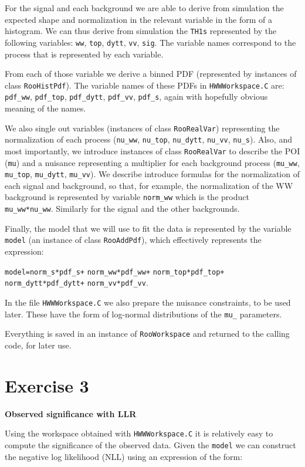 \documentclass[a4paper,12pt]{article}
\begin{document}
For the signal and each background we are able to derive from simulation the
expected shape and normalization in the relevant variable in the form of a
histogram. We can thus derive
from simulation the \verb+TH1s+ represented by the following variables:
\verb+ww+, \verb+top+, \verb+dytt+, \verb+vv+, \verb+sig+. The variable names
correspond to the process that is represented by each variable.

From each of those variable we derive a binned PDF (represented by instances
of class \verb+RooHistPdf+). The variable names of these PDFs in
\verb+HWWWorkspace.C+ are: \verb+pdf_ww+, \verb+pdf_top+, \verb+pdf_dytt+,
\verb+pdf_vv+, \verb+pdf_s+, again with hopefully obvious meaning of the
names.

We also single out variables (instances of class \verb+RooRealVar+)
representing the normalization of each process (\verb+nu_ww+, \verb+nu_top+,
\verb+nu_dytt+, \verb+nu_vv+, \verb+nu_s+).
Also, and most importantly, we introduce instances of class \verb+RooRealVar+
to describe the POI (\verb+mu+) and a nuisance representing a multiplier for
each background process (\verb+mu_ww+, \verb+mu_top+,
\verb+mu_dytt+, \verb+mu_vv+).
We describe introduce formulas for the normalization of each signal and
background, so that, for example, the normalization of the WW background is
represented by variable \verb+norm_ww+ which is the product
\verb+mu_ww*nu_ww+. Similarly for the signal and the other backgrounds.

Finally, the model that we will use to fit the data is represented by the
variable \verb+model+ (an instance of class \verb!RooAddPdf!), which effectively represents the expression:

\verb!model=norm_s*pdf_s+! 
\verb!norm_ww*pdf_ww+! 
\verb!norm_top*pdf_top+!\\ 
\verb!norm_dytt*pdf_dytt+! 
\verb!norm_vv*pdf_vv!.

In the file \verb+HWWWorkspace.C+ we also prepare the nuisance constraints, to
be used later. These have the form of log-normal distributions of the \verb+mu_+
parameters.

Everything is saved in an instance of \verb+RooWorkspace+ and returned to the
calling code, for later use.

\section*{Exercise 3}
{\bf Observed significance with LLR}

Using the workspace obtained with \verb+HWWWorkspace.C+ it is relatively easy
to compute the significance of the observed data.
Given the \verb+model+ we can construct the negative log likelihood (NLL) using an expression of
the form:
\end{document}
